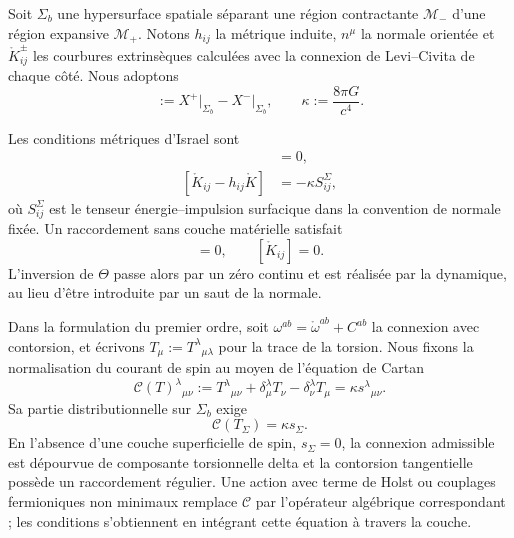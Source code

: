 Soit \(\Sigma_b\) une hypersurface spatiale séparant une région
contractante \(\mathcal M_-\) d'une région expansive
\(\mathcal M_+\). Notons \(h_{ij}\) la métrique induite,
\(n^\mu\) la normale orientée et
\(\mathring K_{ij}^\pm\) les courbures extrinsèques calculées avec la
connexion de Levi--Civita de chaque côté. Nous adoptons
\begin{equation}
 [X]:=X^+\big|_{\Sigma_b}-X^-\big|_{\Sigma_b},
 \qquad
 \kappa:=\frac{8\pi G}{c^4}.
 \label{eq:descendant-jump-kappa}
\end{equation}

Les conditions métriques d'Israel sont
\begin{align}
 [h_{ij}]&=0,
 \label{eq:descendant-Israel-first}\\
 [\mathring K_{ij}-h_{ij}\mathring K]
 &=-\kappa S^{\Sigma}_{ij},
 \label{eq:descendant-Israel-second}
\end{align}
où \(S^\Sigma_{ij}\) est le tenseur énergie--impulsion surfacique dans la
convention de normale fixée. Un raccordement sans couche matérielle satisfait
\begin{equation}
 [h_{ij}]=0,
 \qquad
 [\mathring K_{ij}]=0.
 \label{eq:descendant-shell-free-Israel}
\end{equation}
L'inversion de \(\Theta\) passe alors par un zéro continu et est
réalisée par la dynamique, au lieu d'être introduite par un saut de la
normale.

Dans la formulation du premier ordre, soit
\(\omega^{ab}=\mathring\omega^{ab}+C^{ab}\) la connexion avec contorsion,
et écrivons \(T_\mu:=T^\lambda{}_{\mu\lambda}\) pour la trace de la
torsion.
Nous fixons la normalisation du courant de spin au moyen de l'équation
de Cartan
\begin{equation}
 \mathscr C(T)^{\lambda}{}_{\mu\nu}
 :=T^{\lambda}{}_{\mu\nu}
 +\delta^\lambda_\mu T_\nu
 -\delta^\lambda_\nu T_\mu
 =\kappa s^{\lambda}{}_{\mu\nu}.
 \label{eq:descendant-Cartan-equation}
\end{equation}
Sa partie distributionnelle sur \(\Sigma_b\) exige
\begin{equation}
 \boxed{
 \mathscr C(T_\Sigma)
 =\kappa s_\Sigma.}
 \label{eq:descendant-Cartan-junction}
\end{equation}
En l'absence d'une couche superficielle de spin,
\(s_\Sigma=0\), la connexion admissible est dépourvue de composante torsionnelle
delta et la contorsion tangentielle possède un raccordement régulier. Une action avec
terme de Holst ou couplages fermioniques non minimaux remplace
\(\mathscr C\) par l'opérateur algébrique correspondant ; les conditions
s'obtiennent en intégrant cette équation à travers la couche.

